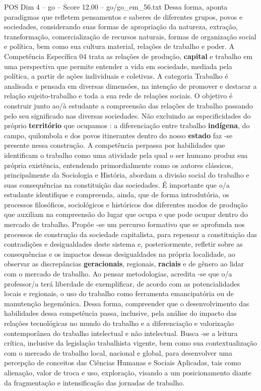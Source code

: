 \begin{textsample}{POS Dim 4 – go – Score 12.00 – go/go\_em\_56.txt}
Dessa forma, aponta paradigmas que refletem pensamentos e saberes de diferentes grupos, povos e sociedades, considerando suas formas de apropriação da natureza, extração, transformação, comercialização de recursos naturais, formas de organização social e política, bem como sua cultura material, relações de trabalho e poder.
A Competência Específica 04 trata as relações de produção, \textbf{capital} e trabalho em uma perspectiva que permite entender a vida em sociedade, mediada pela política, a partir de ações individuais e coletivas.
A categoria Trabalho é analisada e pensada em diversas dimensões, na intenção de promover e destacar a relação sujeito-trabalho e toda a sua rede de relações sociais.
O objetivo é construir junto ao/à estudante a compreensão das relações de trabalho passando pelo seu significado nas diversas sociedades.
Não excluindo as especificidades do próprio \textbf{território} que ocupamos : a diferenciação entre trabalho \textbf{indígena}, do campo, quilombola e dos povos itinerantes dentro do nosso \textbf{estado} faz -se presente nessa construção.
A competência perpassa por habilidades que identificam o trabalho como uma atividade pela qual o ser humano produz sua própria existência, entendendo primordialmente como os autores clássicos, principalmente da Sociologia e História, abordam a divisão social do trabalho e suas consequências na constituição das sociedades.
É importante que o/a estudante identifique e compreenda, ainda, que de forma introdutória, os processos filosóficos, sociológicos e históricos dos diferentes modos de produção que auxiliam na compreensão do lugar que ocupa e que pode ocupar dentro do mercado de trabalho.
Propõe -se um percurso formativo que se aprofunda nos processos de construção da sociedade capitalista, para repensar a constituição das contradições e desigualdades deste sistema e, posteriormente, refletir sobre as consequências e os impactos dessas desigualdades na própria localidade, ao observar as discrepâncias \textbf{geracionais}, regionais, \textbf{raciais} e de gênero ao lidar com o mercado de trabalho.
Ao pensar metodologias, acredita -se que o/a professor/a terá liberdade de exemplificar, de acordo com as potencialidades locais e regionais, o uso do trabalho como ferramenta emancipatória ou de manutenção hegemônica.
Dessa forma, compreender que o desenvolvimento das habilidades dessa competência passa, inclusive, pela análise do impacto das relações tecnológicas no mundo do trabalho e a diferenciação e valorização contemporânea do trabalho intelectual e não intelectual.
Busca -se a leitura crítica, inclusive da legislação trabalhista vigente, bem como sua contextualização com o mercado de trabalho local, nacional e global, para desenvolver uma percepção de conceitos das Ciências Humanas e Sociais Aplicadas, tais como alienação, valor de troca e uso, exploração, visando a um posicionamento diante da fragmentação e intensificação das jornadas de trabalho.

\end{textsample}
